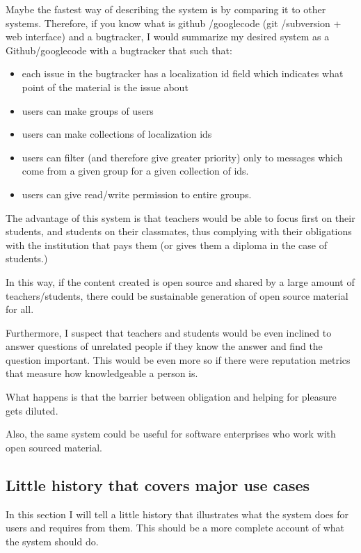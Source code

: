 \documentclass[12pt]{article}
\begin{document}
Maybe the fastest way of describing the system is by comparing it to other systems. Therefore, if you know what is github \cite{Gi12}/googlecode\cite{Go12} (git \cite{git}/subversion \cite{svn} + web interface) and a bugtracker, I would summarize my desired system as a Github/googlecode with a bugtracker that such that:

\begin{itemize}
  \item each issue in the bugtracker has a localization id field which indicates what point of the material is the issue about
  \item users can make groups of users
  \item users can make collections of localization ids
  \item users can filter (and therefore give greater priority) only to messages which come from a given group for a given collection of ids.
  \item users can give read/write permission to entire groups.
\end{itemize}

The advantage of this system is that teachers would be able to focus first on their students, and students on their classmates, thus complying with their obligations with the institution that pays them (or gives them a diploma in the case of students.)

In this way, if the content created is open source and shared by a large amount of teachers/students, there could be sustainable generation of open source material for all.

Furthermore, I suspect that teachers and students would be even inclined to answer questions of unrelated people if they know the answer and find the question important. This would be even more so if there were reputation metrics that measure how knowledgeable a person is.

What happens is that the barrier between obligation and helping for pleasure gets diluted.

Also, the same system could be useful for software enterprises who work with open sourced material.

\subsection{Little history that covers major use cases} \label{use-cases-history}

In this section I will tell a little history that illustrates what the system does for users and requires from them. This should be a more complete account of what the system should do.
\end{document}
